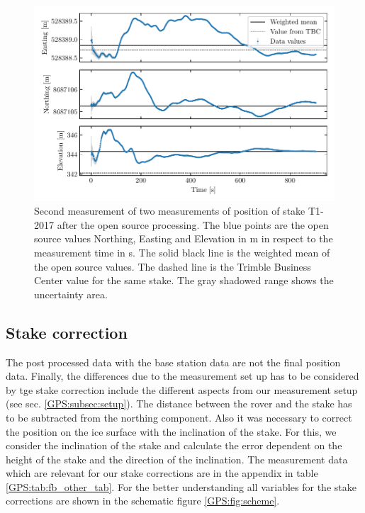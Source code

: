 \begin{figure}[H]
    \centering
    \includegraphics[width=\textwidth]{./figs/timeseries/46250723_corr-T1-ii-2017_Timeseries-east-north-elev.pdf}
    \caption{Second measurement  of two measurements of position of stake T1-2017  after the open source processing. The blue points are the open source values Northing, Easting and Elevation in m in respect to the measurement time in s. The solid black line is the weighted mean of the open source values. The dashed line is the Trimble Business Center value for the same stake. The gray shadowed range shows the uncertainty area.}
    \label{GPS:fig:T1-ii_timeseries}
\end{figure}

\subsection{Stake correction}
The post processed data with the base station data are not the final position data. 
Finally, the differences due to the measurement set up has to be considered by tge stake correction include the different aspects from our measurement setup (see sec. \ref{GPS:subsec:setup}).
The distance between the rover and the stake has to be subtracted from the northing component.
Also it was necessary to correct the position on the ice surface with the inclination of the stake. 
For this, we consider the inclination of the stake and calculate the error dependent on the height of the stake and the direction of the inclination.
The measurement data which are relevant for our stake corrections are in the appendix in table \ref{GPS:tab:fb_other_tab}.
For the better understanding all variables for the stake corrections are shown in the schematic figure \ref{GPS:fig:scheme}.

